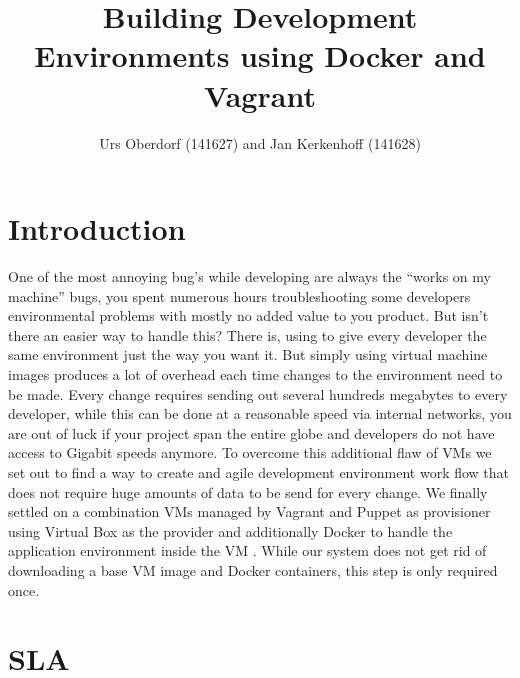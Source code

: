 

\title{Building Development Environments using Docker and Vagrant }
\author{Urs Oberdorf (141627) and Jan Kerkenhoff (141628)}



\maketitle


\thispagestyle{empty}

\clearpage
{}
\setcounter{page}{1}
\tableofcontents

\clearpage
{}

\section{Introduction}

One of the most annoying bug’s while developing are always the “works on my machine” bugs, you spent numerous hours troubleshooting some developers environmental problems with mostly no added value to you product. But isn’t there an easier way to handle this? There is, using to give every developer the same environment just the way you want it. But simply using virtual machine images produces a lot of overhead each time changes to the environment need to be made. Every change requires sending out several hundreds megabytes to every developer, while this can be done at a reasonable speed via internal networks, you are out of luck if your project span the entire globe and developers do not have access to Gigabit speeds anymore. To overcome this additional flaw of \glspl{VM} we set out to find a way to create and agile development environment work flow that does not require huge amounts of data to be send for every change.
We finally settled on a combination \glspl{VM} managed by Vagrant and Puppet as \gls{provisioner} using Virtual Box as the \gls{provider} and additionally Docker to handle the application environment inside the \gls{VM} . While our system does not get rid of downloading a base \gls{VM} image and Docker containers, this step is only required once.


\section{SLA}


